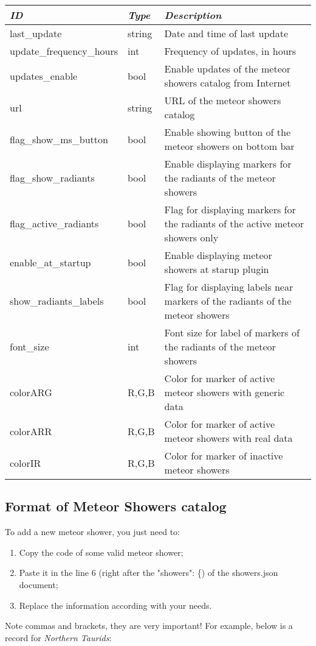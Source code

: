 \begin{longtabu} to \textwidth {l|l|X}\toprule
\emph{ID}            & \emph{Type} & \emph{Description}\\\midrule
last\_update         & string & Date and time of last update \\\midrule
update\_frequency\_hours & int & Frequency of updates, in hours \\\midrule
updates\_enable      & bool & Enable updates of the meteor showers catalog from Internet \\\midrule
url                  & string & URL of the meteor showers catalog \\\midrule
flag\_show\_ms\_button & bool & Enable showing button of the meteor showers on bottom bar \\\midrule
flag\_show\_radiants   & bool & Enable displaying markers for the radiants of the meteor showers \\\midrule
flag\_active\_radiants & bool & Flag for displaying markers for the radiants of the active meteor showers only \\\midrule
enable\_at\_startup    & bool & Enable displaying meteor showers at starup plugin \\\midrule
show\_radiants\_labels & bool & Flag for displaying labels near markers of the radiants of the meteor showers \\\midrule
font\_size             & int  & Font size for label of markers of the radiants of the meteor showers \\\midrule
colorARG               & R,G,B & Color for marker of active meteor showers with generic data \\\midrule
colorARR               & R,G,B & Color for marker of active meteor showers with real data \\\midrule
colorIR               & R,G,B & Color for marker of inactive meteor showers \\\bottomrule
\end{longtabu}

\newpage
\subsection{Format of Meteor Showers catalog}
\label{sec:plugins:MeteorShowers:format}

To add a new meteor shower, you just need to:
\begin{enumerate}
\item Copy the code of some valid meteor shower;
\item Paste it in the line 6 (right after the "showers": \{) of the showers.json document;
\item Replace the information according with your needs.
\end{enumerate}
Note commas and brackets, they are very important! For example, below is a record for \textit{Northern Taurids}:

